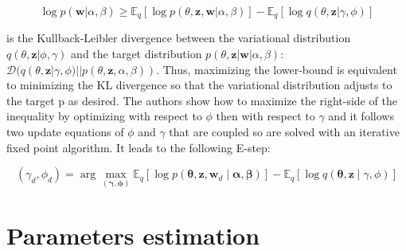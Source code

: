 \documentclass[12pt,a4paper,onecolumn]{article}
\begin{document}
\begin{equation}
	\log p(\mathbf{w}|\alpha, \beta) \geq \mathbb{E}_q[\log p(\theta, \mathbf{z}, \mathbf{w}|\alpha, \beta)] - \mathbb{E}_q[\log q(\theta,\mathbf{z}|\gamma, \phi)] \label{eq_llh}
\end{equation}


is the Kullback-Leibler divergence between the variational distribution $q(\theta, \mathbf{z}|\phi, \gamma)$ and the target distribution $p(\theta, \mathbf{z}|\mathbf{w}|\alpha, \beta)$: $\mathcal{D}(q(\theta, \mathbf{z}|\gamma, \phi)||p(\theta, \mathbf{z}, \alpha, \beta))$. Thus, maximizing the lower-bound is equivalent to minimizing the KL divergence so that the variational distribution adjusts to the target p as desired. The authors show how to maximize the right-side of the inequality by optimizing with respect to $\phi$ then with respect to $\gamma$ and it follows two update equations of $\phi$
and $\gamma$ that are coupled so are solved with an iterative fixed point algorithm. It leads to the following E-step:

\begin{equation*}
	(\gamma_d, \phi_d) = \operatorname{arg}\max_{(\bm{\gamma}, \bm{\phi})} \mathbb{E}_{q}\left[\log p(\bm{\theta},\bm{z}, \bm{w}_d \mid \bm{\alpha}, \bm{\beta})\right] - \mathbb{E}_{q}\left[\log q(\bm{\theta}, \bm{z} \mid \gamma, \phi)\right]              \tag{E-step}
\end{equation*}


\section{Parameters estimation}

\end{document}
